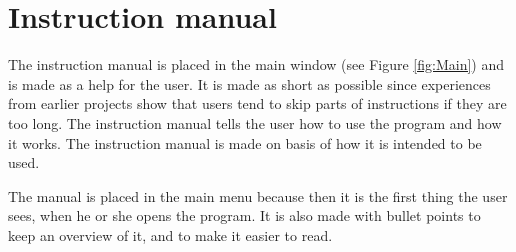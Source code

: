 \section{Instruction manual}
The instruction manual is placed in the main window (see Figure \ref{fig:Main}) and is made as a help for the user. It is made as short as possible since experiences from earlier projects show that users tend to skip parts of instructions if they are too long. The instruction manual tells the user how to use the program and how it works. The instruction manual is made on basis of how it is intended to be used.

The manual is placed in the main menu because then it is the first thing the user sees, when he or she opens the program. It is also made with bullet points to keep an overview of it, and to make it easier to read.